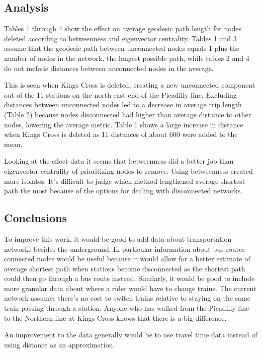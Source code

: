 \documentclass[11pt]{article} %
\begin{document}
\subsection{Analysis}

Tables 1 through 4 show the effect on average geodesic path length for nodes deleted according to betweenness and eigenvector centrality. Tables 1 and 3 assume that the geodesic path between unconnected nodes equals 1 plus the number of nodes in the network, the longest possible path, while tables 2 and 4 do not include distances between unconnected nodes in the average. 

This is seen when Kings Cross is deleted, creating a new unconnected component out of the 11 stations on the north east end of the Picadilly line. Excluding distances between unconnected nodes led to a decrease in average trip length (Table 2) because nodes disconnected had higher than average distance to other nodes, lowering the average metric.  Table 1 shows a large increase in distance when Kings Cross is deleted as 11 distances of about 600 were added to the mean. 

Looking at the effect data it seems that betweenness did a better job than eigenvector centrality of prioritizing nodes to remove. Using betweenness created more isolates. It's difficult to judge which method lengthened average shortest path the most because of the options for dealing with disconnected networks. 


\subsection{Conclusions}

To improve this work, it would be good to add data about transportation networks besides the underground. In particular information about bus routes connected nodes would be useful because it would allow for a better estimate of average shortest path when stations become disconnected as the shortest path could then go through a bus route instead. Similarly, it would be good to include more granular data about where a rider would have to change trains. The current network assumes there's no cost to switch trains relative to staying on the same train passing through a station. Anyone who has walked from the Picadilly line to the Northern line at Kings Cross knows that there is a big difference. 

An improvement to the data generally would be to use travel time data instead of using distance as an approximation. 
\end{document}
